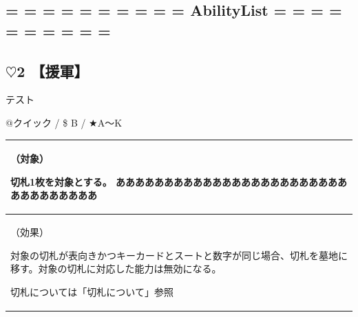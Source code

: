 \documentclass[twocolumn,a5paper,papersize,10pt]{jarticle}
\begin{document}
\begin{center}
\begin{center}
\section*{= = = = = = = = = = AbilityList = = = = = = = = = =}
\end{center}
\end{center}
\vspace{-4zh}%


\vspace{1zh} %
\subsection*{ {\normalsize $\heartsuit$}2 【援軍】} %
\vspace{-0.5zh}

テスト

\begin{tcolorbox}[title=【Action】援軍]


@クイック
  / \$ B
  / ★A〜K

\vspace{-1.2zh}%
\begin{spacing}{0.8}%
\begin{center}

\begin{tabularx}{5.8cm}{p{5.4cm}} \toprule[0.4pt]
（対象）

切札1枚を対象とする。
あああああああああああああああああああああああああああああああああ
\\ \midrule[0.4pt]
（効果）

対象の切札が表向きかつキーカードとスートと数字が同じ場合、切札を墓地に移す。対象の切札に対応した能力は無効になる。 

切札については「切札について」参照

\end{tabularx}

\vspace{-4zh}
\end{center}
\end{spacing}

\end{tcolorbox}

\vspace{-4zh}


\vspace{1zh} %
\end{document}
